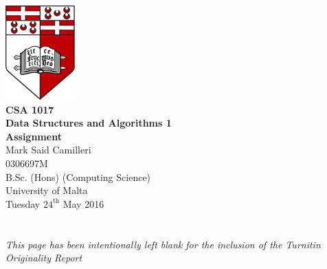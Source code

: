 \documentclass[12pt,a4paper,onesided]{report}
\begin{document}
	\begin{titlepage}
		\vspace*{\fill}
		\centering
		\includegraphics[width=0.2\textwidth]{University_of_Malta_Logo}\\
		\vspace*{3em}
		\textbf{\LARGE CSA 1017\\\vspace{0.1em}Data Structures and Algorithms 1}\\
		\vspace*{0.75em}
		\textbf{\Large Assignment}\\
		\vspace{3em}
		\large Mark Said Camilleri\\
			0306697M\\
			\vspace{2em}
			B.Sc. (Hons) (Computing Science)\\
			University of Malta\\
		\vspace*{2em}
		Tuesday $24^{\text{th}}$ May 2016
		\vfill
	\end{titlepage}
	\pagebreak
	\tableofcontents

\chapter*{}
\vspace{15em}
\begin{center}
\emph{This page has been intentionally left blank for the inclusion of \newline the Turnitin Originality Report} 
\end{center}
\vfill
\end{document}

